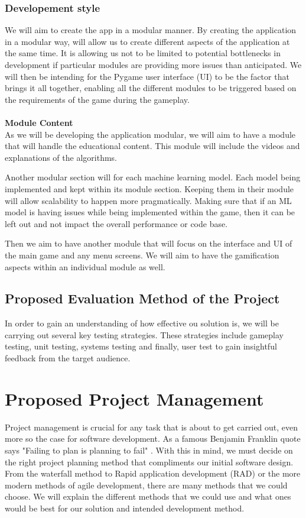 \documentclass[a4paper,10pt]{article}
\begin{document}
\subsubsection{Developement style}
We will aim to create the app in a modular manner. By creating the application in a modular way, will allow us to create different aspects of the application at the same time. It is allowing us not to be limited to potential bottlenecks in development if particular modules are providing more issues than anticipated. We will then be intending for the Pygame user interface (UI) to be the factor that brings it all together, enabling all the different modules to be triggered based on the requirements of the game during the gameplay.\\
 \\
\textbf{Module Content}\\
As we will be developing the application modular, we will aim to have a module that will handle the educational content. This module will include the videos and explanations of the algorithms.

Another modular section will for each machine learning model. Each model being implemented and kept within its module section. Keeping them in their module will allow scalability to happen more pragmatically. Making sure that if an ML model is having issues while being implemented within the game, then it can be left out and not impact the overall performance or code base.

Then we aim to have another module that will focus on the interface and UI of the main game and any menu screens. We will aim to have the gamification aspects within an individual module as well.

\subsection{Proposed Evaluation Method of the Project}
In order to gain an understanding of how effective ou solution is, we will be carrying out several key testing strategies. These strategies include gameplay testing, unit testing, systems testing and finally, user test to gain insightful feedback from the target audience.

\section{Proposed Project Management}
Project management is crucial for any task that is about to get carried out, even more so the case for software development. As a famous Benjamin Franklin quote says "Failing to plan is planning to fail" \cite{plan_to_fail}. With this in mind, we must decide on the right project planning method that compliments our initial software design. From the waterfall method to Rapid application development (RAD) or the more modern methods of agile development, there are many methods that we could choose. We will explain the different methods that we could use and what ones would be best for our solution and intended development method.
\end{document}
